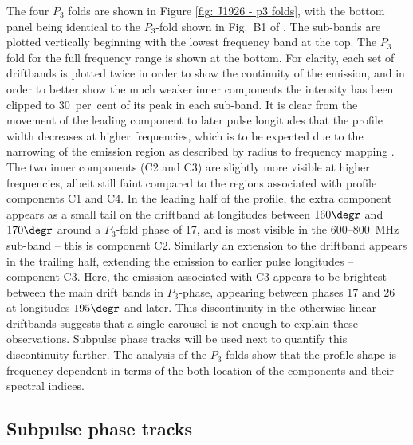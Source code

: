 The four $P_3$ folds are shown in Figure \ref{fig: J1926 - p3 folds}, with the bottom panel being identical to the $P_3$-fold shown in Fig.~B1 of \citet{ZLH+2019}. The sub-bands are plotted vertically beginning with the lowest frequency band at the top. The $P_3$ fold for the full frequency range is shown at the bottom. For clarity, each set of driftbands is plotted twice in order to show the continuity of the emission, and in order to better show the much weaker inner components the intensity has been clipped to 30~per~cent of its peak in each sub-band.  It is clear from the movement of the leading component to later pulse longitudes that the profile width decreases at higher frequencies, which is to be expected due to the narrowing of the emission region as described by radius to frequency mapping \citep[e.g.][]{Cxxx1978}. The two inner components (C2 and C3) are slightly more visible at higher frequencies, albeit still faint compared to the regions associated with profile components C1 and C4. In the leading half of the profile, the extra component appears as a small tail on the driftband at longitudes between $160\degr$ and $170\degr$ around a $P_3$-fold phase of 17, and is most visible in the 600--800~MHz sub-band -- this is component C2. Similarly an extension to the driftband appears in the trailing half, extending the emission to earlier pulse longitudes -- component C3. Here, the emission associated with C3 appears to be brightest between the main drift bands in $P_3$-phase, appearing between phases 17 and 26 at longitudes $195\degr$ and later. This discontinuity in the otherwise linear driftbands suggests that a single carousel is not enough to explain these observations. Subpulse phase tracks will be used next to quantify this discontinuity further. The analysis of the $P_3$ folds show that the profile shape is frequency dependent in terms of the both location of the components and their spectral indices.




\subsection{Subpulse phase tracks}
\label{sec: J1926 - analysis - phase tracks}

